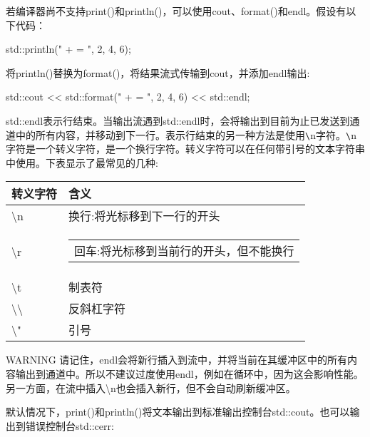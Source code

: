 若编译器尚不支持print()和println()，可以使用cout、format()和endl。假设有以下代码：


\begin{cpp}
std::println("{} + {} = {}", 2, 4, 6);
\end{cpp}

将println()替换为format()，将结果流式传输到cout，并添加endl输出:

\begin{cpp}
std::cout << std::format("{} + {} = {}", 2, 4, 6) << std::endl;
\end{cpp}

std::endl表示行结束。当输出流遇到std::endl时，会将输出到目前为止已发送到通道中的所有内容，并移动到下一行。表示行结束的另一种方法是使用\verb|\|n字符。\verb|\|n字符是一个转义字符，是一个换行字符。转义字符可以在任何带引号的文本字符串中使用。下表显示了最常见的几种:

\begin{longtable}{|l|l|}
\hline
\textbf{转义字符}         & \textbf{含义}                                             \\ \hline
\endfirsthead
%
\endhead
%
\textbackslash{}n                & 换行:将光标移到下一行的开头 \\ \hline
\textbackslash{}r &
\begin{tabular}[c]{@{}l@{}}回车:将光标移到当前行的开头，但不能换行\end{tabular} \\ \hline
\textbackslash{}t                & 制表符                                                          \\ \hline
\textbackslash{}\textbackslash{} & 反斜杠字符                                          \\ \hline
\textbackslash{}"                & 引号                                               \\ \hline
\end{longtable}

\begin{myWarning}{WARNING}
请记住，endl会将新行插入到流中，并将当前在其缓冲区中的所有内容输出到通道中。所以不建议过度使用endl，例如在循环中，因为这会影响性能。另一方面，在流中插入\textbackslash{}n也会插入新行，但不会自动刷新缓冲区。
\end{myWarning}

默认情况下，print()和println()将文本输出到标准输出控制台std::cout。也可以输出到错误控制台std::cerr:

